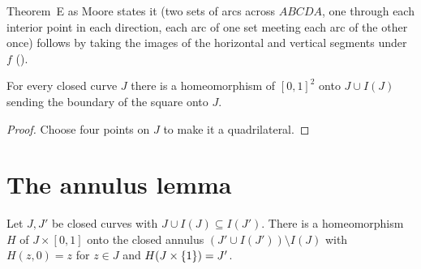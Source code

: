
Theorem~E as Moore states it (two sets of arcs across $ABCDA$, one through each interior point in each direction, each arc of one set
meeting each arc of the other once) follows by taking the images of the horizontal and vertical segments under $f$
().

\begin{corollary}\label{cor:schoenflies-curve}
For every closed curve $J$ there is a homeomorphism of $[0,1]^2$ onto $J\cup I(J)$ sending the boundary of the square onto $J$.
\end{corollary}

\begin{proof}
Choose four points on $J$ to make it a quadrilateral.
\end{proof}


\section{The annulus lemma}\label{sec:annulus}

\begin{theorem}\label{thm:annulus}
Let $J,J'$ be closed curves with $J\cup I(J)\subseteq I(J')$. There is a homeomorphism $H$ of $J\times[0,1]$ onto the closed annulus
$(J'\cup I(J'))\setminus I(J)$ with $H(z,0)=z$ for $z\in J$ and $H(J\times\left\{ 1 \right\})=J'$.
\end{theorem}

